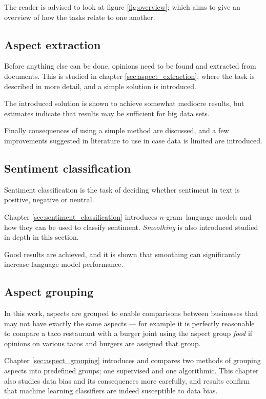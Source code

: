 \documentclass[a4paper,11pt]{kth-mag}
\newcommand{\ngram}{$n$-gram}
\begin{document}
The reader is advised to look at figure \ref{fig:overview}; which aims to
give an overview of how the tasks relate to one another.

\subsection{Aspect extraction}
Before anything else can be done, opinions need to be found and extracted from documents.
This is studied in chapter \ref{sec:aspect_extraction}, where the task is described in more detail,
and a simple solution is introduced.

The introduced solution is shown to achieve somewhat mediocre results, but estimates indicate
that results may be sufficient for big data sets.

Finally consequences of using a simple method are discussed, and a few improvements suggested in literature
to use in case data is limited are introduced.


\subsection{Sentiment classification}
Sentiment classification is the task of deciding whether sentiment in text is positive, negative or neutral.

Chapter \ref{sec:sentiment_classification} introduces \ngram~language models and how they can be used
to classify sentiment. \emph{Smoothing} is also introduced studied in depth in this section.

Good results are achieved, and it is shown that smoothing can significantly increase language
model performance.

\subsection{Aspect grouping}
In this work, aspects are grouped to enable comparisons between businesses that may not have exactly the same aspects ---
for example it is perfectly reasonable to compare a taco restaurant with a burger joint using the aspect group \emph{food}
if opinions on various tacos and burgers are assigned that group.

Chapter \ref{sec:aspect_grouping} introduces and compares two methods of grouping aspects into predefined groups;
one supervised and one algorithmic. This chapter also studies data bias and its consequences more carefully,
and results confirm that machine learning classifiers are indeed susceptible to data bias.
\end{document}
